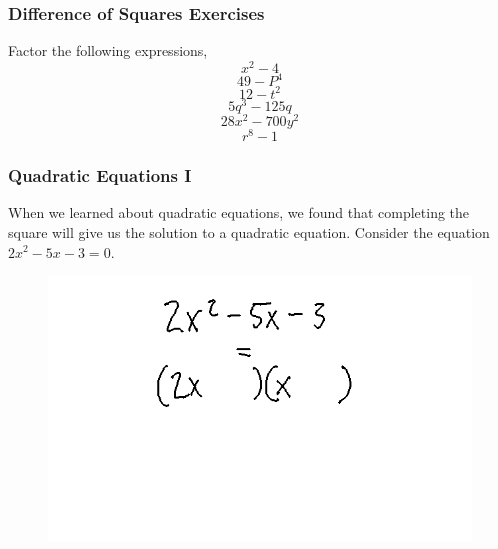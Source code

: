 \documentclass[xcolor=dvipsnames]{beamer}
\begin{document}
\begin{frame}
  \frametitle{Difference of Squares Exercises}
Factor the following expressions,
\begin{equation}
  \label{eq:gaiphahg}
x^{2}-4  
\end{equation}
\begin{equation}
  \label{eq:vaecutha}
49-P^{4}  
\end{equation}
\begin{equation}
  \label{eq:woobiedo}
12-t^{2}  
\end{equation}
\begin{equation}
  \label{eq:aashiech}
5q^{3}-125q  
\end{equation}
\begin{equation}
  \label{eq:shioreey}
28x^{2}-700y^{2}
\end{equation}
\begin{equation}
  \label{eq:ohpeefio}
r^{8}-1
\end{equation}
\end{frame}

\begin{frame}
  \frametitle{Quadratic Equations I}
  When we learned about quadratic equations, we found that completing
  the square will give us the solution to a quadratic equation.
  Consider the equation $2x^{2}-5x-3=0$.
  \begin{figure}[h]
    \includegraphics[scale=.4]{./qfac1.png}
  \end{figure}
\end{frame}
\end{document}
